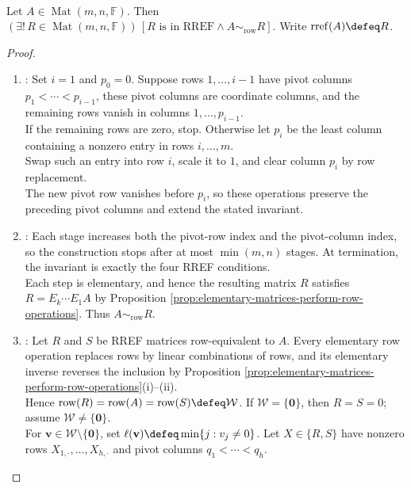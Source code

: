 \begin{theorem} \label{thm:rref-existence-uniqueness-and-elementary-factorization} \\
Let $A\in\operatorname{Mat}(m,n,\mathbb{F})$. Then $(\exists!\,R\in\operatorname{Mat}(m,n,\mathbb{F}))\,[R\text{ is in RREF}\land A\sim_{\mathrm{row}}R]$. Write $\operatorname{rref}(A)\defeq R$.
\begin{proof}
\begin{enumerate}[label=(\roman*)]
\setlength{\itemsep}{0pt}
\item {}: Set $i=1$ and $p_0=0$. Suppose rows $1,\ldots,i-1$ have pivot columns $p_1<\cdots<p_{i-1}$, these pivot columns are coordinate columns, and the remaining rows vanish in columns $1,\ldots,p_{i-1}$.\\
If the remaining rows are zero, stop. Otherwise let $p_i$ be the least column containing a nonzero entry in rows $i,\ldots,m$.\\
Swap such an entry into row $i$, scale it to $1$, and clear column $p_i$ by row replacement.\\
The new pivot row vanishes before $p_i$, so these operations preserve the preceding pivot columns and extend the stated invariant.
\item {}: Each stage increases both the pivot-row index and the pivot-column index, so the construction stops after at most $\min(m,n)$ stages. At termination, the invariant is exactly the four RREF conditions.\\
Each step is elementary, and hence the resulting matrix $R$ satisfies $R=E_k\cdots E_1A$ by Proposition \ref{prop:elementary-matrices-perform-row-operations}. Thus $A\sim_{\mathrm{row}}R$.
\item {}: Let $R$ and $S$ be RREF matrices row-equivalent to $A$. Every elementary row operation replaces rows by linear combinations of rows, and its elementary inverse reverses the inclusion by Proposition \ref{prop:elementary-matrices-perform-row-operations}(i)--(ii).\\
Hence $\operatorname{row}(R)=\operatorname{row}(A)=\operatorname{row}(S)\defeq\mathcal{W}$. If $\mathcal{W}=\{\mathbf{0}\}$, then $R=S=0$; assume $\mathcal{W}\neq\{\mathbf{0}\}$.\\
For $\mathbf{v}\in\mathcal{W}\setminus\{\mathbf{0}\}$, set $\ell(\mathbf{v})\defeq\min\{j:v_j\neq0\}$. Let $X\in\{R,S\}$ have nonzero rows $X_{1,\cdot},\ldots,X_{h,\cdot}$ and pivot columns $q_1<\cdots<q_h$.\\

\end{enumerate}
\end{proof}
\end{theorem}
